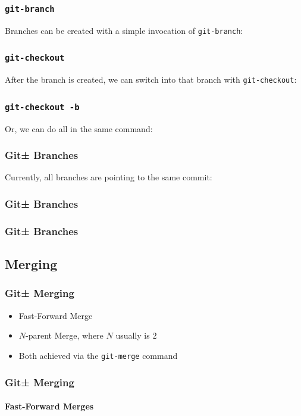 \documentclass{beamer}
\begin{document}
\begin{frame}[fragile]
\frametitle{\texttt{git-branch}}
Branches can be created with a simple invocation of \texttt{git-branch}:

\end{frame}

\begin{frame}[fragile]
\frametitle{\texttt{git-checkout}}
After the branch is created, we can switch into that branch with
\texttt{git-checkout}:

\end{frame}

\begin{frame}[fragile]
\frametitle{\texttt{git-checkout -b}}
Or, we can do all in the same command:

\end{frame}

\begin{frame}[fragile]
\frametitle{Git± Branches}
Currently, all branches are pointing to the same commit:

\end{frame}

\begin{frame}[fragile]
\frametitle{Git± Branches}

\end{frame}

\begin{frame}[fragile]
\frametitle{Git± Branches}

\end{frame}

\subsection{Merging}
\begin{frame}
\frametitle{Git± Merging}
\begin{itemize}
\item{Fast-Forward Merge}
\item{$N$-parent Merge, where $N$ usually is $2$}
\item{Both achieved via the \texttt{git-merge} command}
\end{itemize}
\end{frame}

\begin{frame}
\frametitle{Git± Merging}
\framesubtitle{Fast-Forward Merges}
\begin{figure}
\end{figure}
\end{frame}
\end{document}
